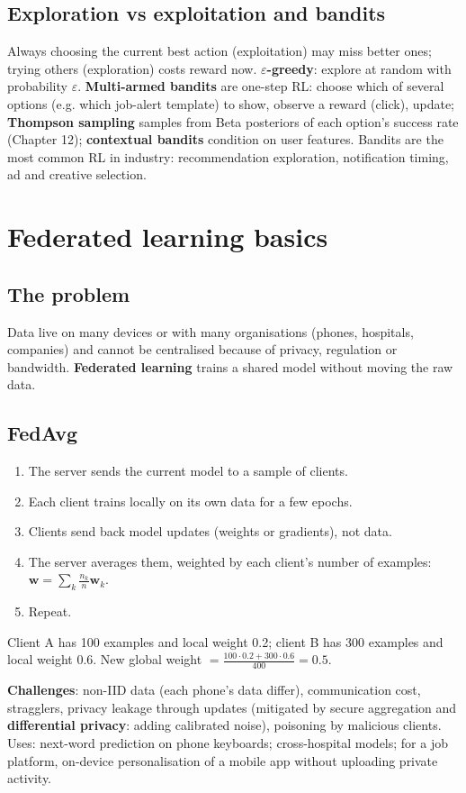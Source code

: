 \subsection{Exploration vs exploitation and bandits}
Always choosing the current best action (exploitation) may miss better ones; trying others (exploration) costs reward now. \textbf{$\varepsilon$-greedy}: explore at random
with probability $\varepsilon$. \textbf{Multi-armed bandits} are one-step RL: choose which of several options (e.g. which job-alert template) to show, observe a reward
(click), update; \textbf{Thompson sampling} samples from Beta posteriors of each option's success rate (Chapter 12); \textbf{contextual bandits} condition on user features.
Bandits are the most common RL in industry: recommendation exploration, notification timing, ad and creative selection.

\section{Federated learning basics}
\subsection{The problem}
Data live on many devices or with many organisations (phones, hospitals, companies) and cannot be centralised because of privacy, regulation or bandwidth.
\textbf{Federated learning} trains a shared model without moving the raw data.

\subsection{FedAvg}
\begin{enumerate}
\item The server sends the current model to a sample of clients.
\item Each client trains locally on its own data for a few epochs.
\item Clients send back model updates (weights or gradients), not data.
\item The server averages them, weighted by each client's number of examples: $\mathbf w = \sum_k\frac{n_k}{n}\mathbf w_k$.
\item Repeat.
\end{enumerate}
\begin{example}
Client A has 100 examples and local weight 0.2; client B has 300 examples and local weight 0.6. New global weight $= \frac{100\cdot0.2 + 300\cdot0.6}{400} = 0.5$.
\end{example}
\textbf{Challenges}: non-IID data (each phone's data differ), communication cost, stragglers, privacy leakage through updates (mitigated by secure aggregation and
\textbf{differential privacy}: adding calibrated noise), poisoning by malicious clients. Uses: next-word prediction on phone keyboards; cross-hospital models; for a job
platform, on-device personalisation of a mobile app without uploading private activity.

